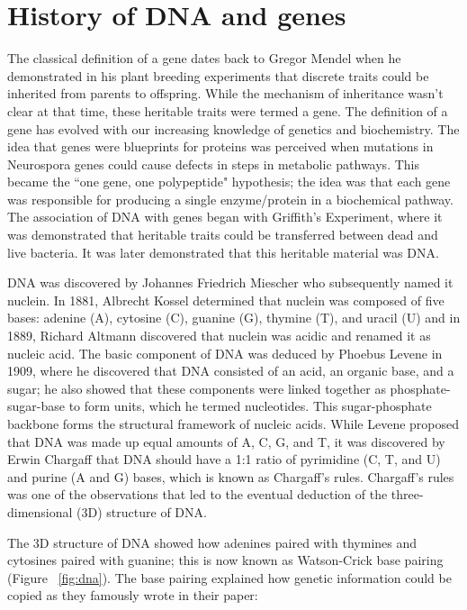\section{History of DNA and genes}

The classical definition of a gene dates back to Gregor Mendel when he demonstrated in his plant breeding experiments that discrete traits could be inherited from parents to offspring. While the mechanism of inheritance wasn't clear at that time, these heritable traits were termed a gene. The definition of a gene has evolved with our increasing knowledge of genetics and biochemistry\cite{pmid17567988}. The idea that genes were blueprints for proteins was perceived when mutations in Neurospora genes could cause defects in steps in metabolic pathways\cite{pmid16578042}. This became the ``one gene, one polypeptide" hypothesis; the idea was that each gene was responsible for producing a single enzyme/protein in a biochemical pathway. The association of DNA with genes began with Griffith's Experiment\cite{griffith1928significance}, where it was demonstrated that heritable traits could be transferred between dead and live bacteria. It was later demonstrated that this heritable material was DNA\cite{avery1944studies}.

DNA was discovered by Johannes Friedrich Miescher who subsequently named it nuclein. In 1881, Albrecht Kossel determined that nuclein was composed of five bases: adenine (A), cytosine (C), guanine (G), thymine (T), and uracil (U) and in 1889, Richard Altmann discovered that nuclein was acidic and renamed it as nucleic acid. The basic component of DNA was deduced by Phoebus Levene in 1909, where he discovered that DNA consisted of an acid, an organic base, and a sugar; he also showed that these components were linked together as phosphate-sugar-base to form units, which he termed nucleotides. This sugar-phosphate backbone forms the structural framework of nucleic acids. While Levene proposed that DNA was made up equal amounts of A, C, G, and T, it was discovered by Erwin Chargaff that DNA should have a 1:1 ratio of pyrimidine (C, T, and U) and purine (A and G) bases, which is known as Chargaff's rules. Chargaff's rules was one of the observations that led to the eventual deduction of the three-dimensional (3D) structure of DNA.

The 3D structure of DNA showed how adenines paired with thymines and cytosines paired with guanine\cite{WATSON_1953}; this is now known as Watson-Crick base pairing (Figure ~\ref{fig:dna}). The base pairing explained how genetic information could be copied as they famously wrote in their paper:

